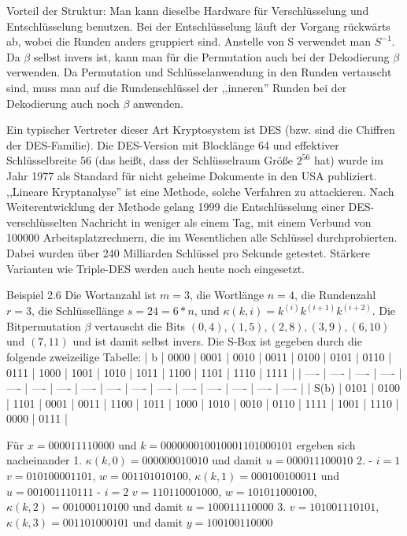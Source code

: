 \documentclass[a4paper]{article}
\begin{document}
\begin{multicols}{3}
    Vorteil der Struktur: Man kann dieselbe Hardware für Verschlüsselung und Entschlüsselung benutzen. Bei der Entschlüsselung läuft der Vorgang rückwärts ab, wobei die Runden anders gruppiert sind. Anstelle von S verwendet man $S^{-1}$. Da $\beta$ selbst invers ist, kann man für die Permutation auch bei der Dekodierung $\beta$ verwenden. Da Permutation und Schlüsselanwendung in den Runden vertauscht sind, muss man auf die Rundenschlüssel der ,,inneren'' Runden bei der Dekodierung auch noch $\beta$ anwenden.

    Ein typischer Vertreter dieser Art Kryptosystem ist DES (bzw. sind die Chiffren der DES-Familie). Die DES-Version mit Blocklänge 64 und effektiver Schlüsselbreite 56 (das heißt, dass der Schlüsselraum Größe $2^{56}$ hat) wurde im Jahr 1977 als Standard für nicht geheime Dokumente in den USA publiziert. ,,Lineare Kryptanalyse'' ist eine Methode, solche Verfahren zu attackieren. Nach Weiterentwicklung der Methode gelang 1999 die Entschlüsselung einer DES-verschlüsselten Nachricht in weniger als einem Tag, mit einem Verbund von 100000 Arbeitsplatzrechnern, die im Wesentlichen alle Schlüssel durchprobierten. Dabei wurden über 240 Milliarden Schlüssel pro Sekunde getestet. Stärkere Varianten wie Triple-DES werden auch heute noch eingesetzt.

    Beispiel 2.6 Die Wortanzahl ist $m=3$, die Wortlänge $n=4$, die Rundenzahl $r=3$, die Schlüssellänge $s=24=6*n$, und $\kappa (k,i)=k^{(i)}k^{(i+1)}k^{(i+2)}$. Die Bitpermutation $\beta$ vertauscht die Bits $(0,4),(1,5),(2,8),(3,9),(6,10)$ und $(7,11)$ und ist damit selbst invers. Die S-Box ist gegeben durch die folgende zweizeilige Tabelle:
    | b    | 0000 | 0001 | 0010 | 0011 | 0100 | 0101 | 0110 | 0111 | 1000 | 1001 | 1010 | 1011 | 1100 | 1101 | 1110 | 1111 |
    | ---- | ---- | ---- | ---- | ---- | ---- | ---- | ---- | ---- | ---- | ---- | ---- | ---- | ---- | ---- | ---- |
    | S(b) | 0101 | 0100 | 1101 | 0001 | 0011 | 1100 | 1011 | 1000 | 1010 | 0010 | 0110 | 1111 | 1001 | 1110 | 0000 | 0111 |

    Für $x= 0000 1111 0000$ und $k=0000 0001 0010 0011 0100 0101$ ergeben sich nacheinander
    1. $\kappa (k,0) = 0000 0001 0010$ und damit $u= 0000 1110 0010$
    2.
    - $i=1$ $v=0101 0000 1101$, $w=0011 0101 0100$, $\kappa (k,1) = 0001 0010 0011$ und $u=0010 0111 0111$
    - $i=2$ $v=1101 1000 1000$, $w=1010 1100 0100$, $\kappa (k,2) = 0010 0011 0100$ und damit $u= 1000 1111 0000$
    3. $v=1010 0111 0101$, $\kappa (k,3) = 0011 0100 0101$ und damit $y=1001 0011 0000$



\end{multicols}
\end{document}
